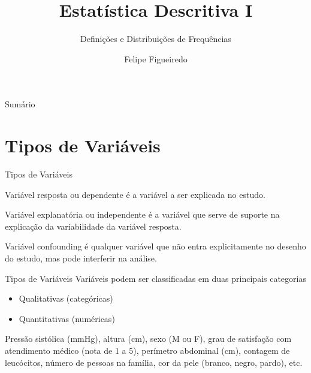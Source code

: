 \documentclass{beamer}
\title%
{Estatística Descritiva I}
\subtitle
{Definições e Distribuições de Frequências} %
\author%
{Felipe Figueiredo}%
\institute[INTO] %
{
Instituto Nacional de Traumatologia e Ortopedia}
\date%
{}
\begin{document}
\begin{frame}
  \titlepage
\end{frame}

\begin{frame}{Sumário}
  \tableofcontents
\end{frame}






\section{Tipos de Variáveis}

\begin{frame}{Tipos de Variáveis}
  \begin{definition}
    Variável \alert{resposta} ou \alert{dependente} é a variável a ser
    explicada no estudo.
  \end{definition}
  \pause
  \begin{definition}
    Variável \alert{explanatória} ou \alert{independente} é a variável
    que serve de suporte na explicação da variabilidade da variável
    resposta.
  \end{definition}
  \pause
  \begin{definition}
    Variável \alert{confounding} é qualquer variável que não entra
    explicitamente no desenho do estudo, mas pode interferir na
    análise.
  \end{definition}
\end{frame}

\begin{frame}{Tipos de Variáveis}
Variáveis podem ser classificadas em duas principais categorias
  \begin{itemize}
  \item Qualitativas (categóricas)
  \item Quantitativas (numéricas)
  \end{itemize}
  \begin{example}
    Pressão sistólica (mmHg), altura (cm), sexo (M ou F), grau de
    satisfação com atendimento médico (nota de 1 a 5), perímetro
    abdominal (cm), contagem de leucócitos, número de pessoas na
    família, cor da pele (branco, negro, pardo), etc.
  \end{example}

\end{frame}
\end{document}
